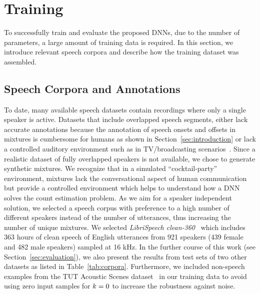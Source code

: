 \section{Training}%
\label{sec:training}

To successfully train and evaluate the proposed DNNs, due to the number of parameters, a large amount of training data is required.
In this section, we introduce relevant speech corpora and describe how the training dataset was assembled.

\subsection{Speech Corpora and Annotations}%
\label{ssec:corpus}
To date, many available speech datasets contain recordings where only a single speaker is active.
Datasets that include overlapped speech segments, either lack accurate annotations because the annotation of speech onsets and offsets in mixtures is cumbersome for humans as shown in Section~\ref{sec:introduction} or lack a controlled auditory environment such as in TV/broadcasting scenarios~\cite{Gravier12}.
Since a realistic dataset of fully overlapped speakers is not available, we chose to generate synthetic mixtures.
We recognize that in a simulated ``cocktail-party'' environment, mixtures lack the conversational aspect of human communication but provide a controlled environment which helps to understand how a DNN solves the count estimation problem.
As we aim for a speaker independent solution, we selected a speech corpus with preference to a high number of different speakers instead of the number of utterances, thus increasing the number of unique mixtures.
We selected \emph{LibriSpeech clean-360}\ \cite{panayotov15} which includes 363 hours of clean speech of English utterances from 921 speakers (439 female and 482 male speakers) sampled at 16 kHz.
In the further course of this work (see Section~\ref{sec:evaluation}), we also present the results from test sets of two other datasets as listed in Table~\ref{tab:corpora}.
Furthermore, we included non-speech examples from the TUT Acoustic Scenes dataset~\cite{Mesaros16} in our training data to avoid using zero input samples for \(k = 0\) to increase the robustness against noise.

